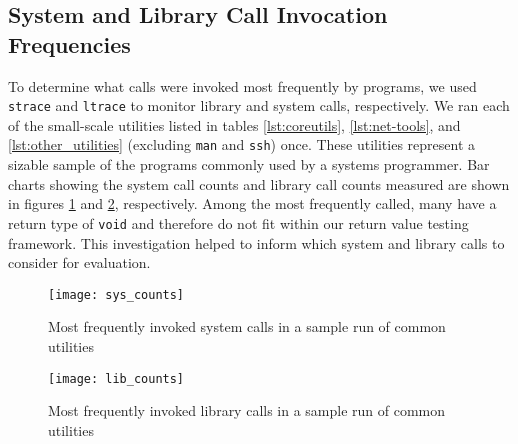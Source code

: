 \subsection{System and Library Call Invocation Frequencies}
To determine what calls were invoked most frequently by programs, we used \texttt{strace} and \texttt{ltrace} to monitor library and system calls, respectively. We ran each of the small-scale utilities listed in tables \ref{lst:coreutils}, \ref{lst:net-tools}, and \ref{lst:other_utilities} (excluding \texttt{man} and \texttt{ssh}) once. These utilities represent a sizable sample of the programs commonly used by a systems programmer. Bar charts showing the system call counts and library call counts measured are shown in figures \ref{fig:sys_counts} and \ref{fig:lib_counts}, respectively. Among the most frequently called, many have a return type of \texttt{void} and therefore do not fit within our return value testing framework. This investigation helped to inform which system and library calls to consider for evaluation.\\
\begin{figure}[h]
\centering
\texttt{[image: sys\_counts]}
\caption{Most frequently invoked system calls in a sample run of common utilities}
\label{fig:sys_counts}
\end{figure}

\begin{figure}[h]
\centering
\texttt{[image: lib\_counts]}
\caption{Most frequently invoked library calls in a sample run of common utilities}
\label{fig:lib_counts}
\end{figure}
